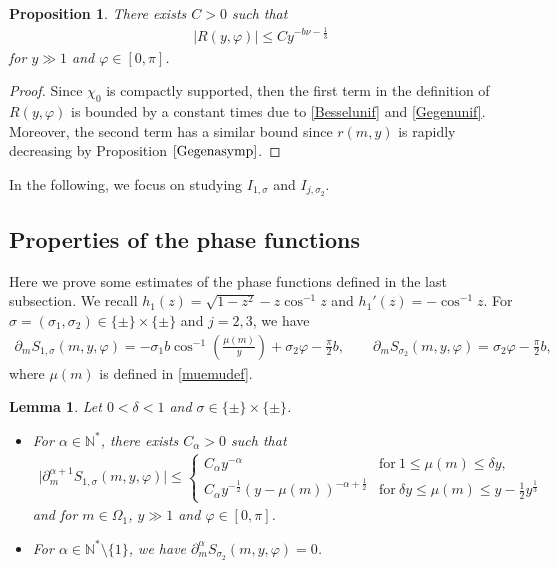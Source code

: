 \documentclass[10pt,a4paper]{amsart}
\numberwithin{equation}{section}
\newtheorem{Lemma}[Theorem]{Lemma}
\newtheorem{Proposition}[Theorem]{Proposition}
 { \theoremstyle{definition}
\newtheorem{Definition}[Theorem]{Definition}
\newtheorem{Note}[Theorem]{Note}
\newtheorem{Example}[Theorem]{Example}
\newtheorem{Remark}[Theorem]{Remark} }
\def\d{\,\mathrm{d}}%
\def\a{\alpha}
\def\d{\delta}
\def\f{\varphi}
\def\m{\mu}
\def\n{\nu}
\def\s{\sigma}
\def\pa{\partial}
\begin{document}
\begin{Proposition}\label{Ryphiprop}
There exists $C>0$ such that
\begin{align*}
|R(y,\f)|\leq Cy^{-b\n-\frac{1}{3}}
\end{align*}
for $y\gg 1$ and $\f\in [0,\pi]$.
\end{Proposition}
\begin{proof}
Since $\chi_0$ is compactly supported, then the first term in the definition of $R(y,\f)$ is bounded by a constant times \smash{$y^{-b\n}\cdot y^{-\frac{1}{3}}=y^{-b\n-\frac{1}{3}}$} due to \eqref{Besselunif} and \eqref{Gegenunif}. Moreover, the second term has a similar bound since $r(m,y)$ is rapidly decreasing by Proposition $\ref{Gegenasymp}$.
\end{proof}

In the following, we focus on studying $I_{1,\s}$ and $I_{j,\s_2}$.

\subsection{Properties of the phase functions}

Here we prove some estimates of the phase functions defined in the last subsection.
We recall $h_1(z)=\sqrt{1-z^2}-z\cos^{-1} z$ and
$
h_1'(z)=-\cos^{-1}z$.
For $\s=(\s_1,\s_2)\in \{\pm\}\times \{\pm\}$ and $j=2,3$, we have
\begin{align*}
\pa_mS_{1,\s}(m,y,\f)=-\s_1 b\cos^{-1}\left(\frac{\m(m)}{y} \right)+\s_2\f-\frac{\pi}{2}b,\qquad \pa_mS_{\s_2}(m,y,\f)=\s_2 \f-\frac{\pi}{2}b,
\end{align*}
where $\m(m)$ is defined in \eqref{muemudef}.

\begin{Lemma}\label{phaseest}
Let $0<\d<1$ and $\s\in \{\pm\}\times \{\pm\}$.
\begin{itemize}\itemsep=0pt
\item[$(i)$] For $\a\in\mathbb{N}^*$, there exists $C_{\a}>0$ such that
\begin{align*}
\big|\pa_m^{\a+1}S_{1,\s}(m,y,\f)\big|\leq \begin{cases}C_{\a}y^{-\a}&  \text{for}\  1\leq \m(m)\leq \d y,\\
C_{\a}y^{-\frac{1}{2}}(y-\m(m))^{-\a+\frac{1}{2}}& \text{for}\  \d y\leq \m(m)\leq y-\frac{1}{2}y^{\frac{1}{3}}
\end{cases}
\end{align*}
and for $m\in \Omega_1$, $y\gg 1$ and $\f\in [0,\pi]$.
\item[$(ii)$] For $\a\in\mathbb{N}^*\setminus \{1\}$, we have $\pa_m^{\a}S_{\s_2}(m,y,\f)=0$.
\end{itemize}
\end{Lemma}
\end{document}
